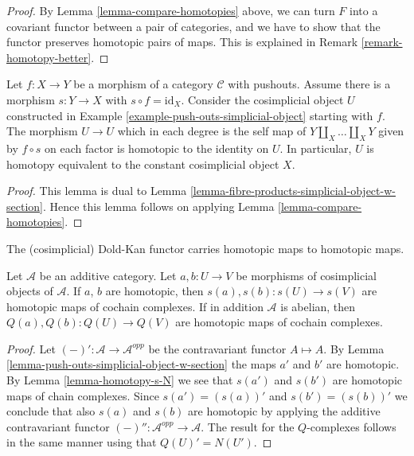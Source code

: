 \begin{proof}
By Lemma \ref{lemma-compare-homotopies} above, we can
turn $F$ into a covariant functor between a pair of
categories, and we have to show that the functor preserves homotopic pairs
of maps. This is explained in Remark \ref{remark-homotopy-better}.
\end{proof}

\begin{lemma}
\label{lemma-push-outs-simplicial-object-w-section}
Let $f : X \to Y$ be a morphism of a category $\mathcal{C}$ with
pushouts. Assume there is a morphism $s : Y \to X$ with
$s \circ f = \text{id}_X$. Consider the cosimplicial object $U$ constructed in
Example \ref{example-push-outs-simplicial-object}
starting with $f$. The morphism $U \to U$ which in each degree
is the self map of $Y \amalg_X \ldots \amalg_X Y$
given by $f \circ s$ on each factor is homotopic to the identity on $U$.
In particular, $U$ is homotopy equivalent to the constant
cosimplicial object $X$.
\end{lemma}

\begin{proof}
This lemma is dual to
Lemma \ref{lemma-fibre-products-simplicial-object-w-section}.
Hence this lemma follows on applying
Lemma \ref{lemma-compare-homotopies}.
\end{proof}

\begin{lemma}
\label{lemma-homotopy-s-Q}
\begin{slogan}
The (cosimplicial) Dold-Kan functor carries homotopic maps to homotopic maps.
\end{slogan}
Let $\mathcal{A}$ be an additive category. Let $a, b : U \to V$ be morphisms
of cosimplicial objects of $\mathcal{A}$. If $a$, $b$ are homotopic,
then $s(a), s(b) : s(U) \to s(V)$ are homotopic maps of cochain complexes.
If in addition $\mathcal{A}$ is abelian, then $Q(a), Q(b) : Q(U) \to Q(V)$
are homotopic maps of cochain complexes.
\end{lemma}

\begin{proof}
Let $(-)' : \mathcal{A} \to \mathcal{A}^{opp}$
be the contravariant functor $A \mapsto A$. By
Lemma \ref{lemma-push-outs-simplicial-object-w-section}
the maps $a'$ and $b'$ are homotopic.
By Lemma \ref{lemma-homotopy-s-N} we see that
$s(a')$ and $s(b')$ are homotopic maps of chain
complexes. Since $s(a') = (s(a))'$ and
$s(b') = (s(b))'$ we conclude that also
$s(a)$ and $s(b)$ are homotopic by applying the additive
contravariant functor $(-)'' : \mathcal{A}^{opp} \to \mathcal{A}$.
The result for the $Q$-complexes follows in the same manner
using that $Q(U)' = N(U')$.
\end{proof}

